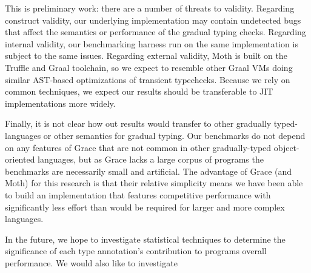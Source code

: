 \documentclass[sigplan,10pt,review,screen]{acmart}\settopmatter{printfolios=true}
\begin{document}
This is preliminary work: there are a number of threats to validity. 
Regarding construct validity, 
our underlying
implementation may contain undetected bugs that affect the semantics
or performance of the gradual typing checks. Regarding internal
validity,
our benchmarking harness run on the same implementation is
subject to the same issues. Regarding external validity, 
Moth is built
on the Truffle and Graal toolchain, so we expect
to resemble other Graal
VMs doing similar AST-based optimizations of transient typechecks.
Because we rely on common techniques, 
we expect our results should be transferable to JIT implementations
more widely.


Finally, it is not clear how out results would transfer
to other gradually typed-languages or other semantics for gradual typing.
Our benchmarks do not depend on any features of Grace
that are not common in other gradually-typed object-oriented
languages, but as Grace lacks a large corpus of programs the
benchmarks are necessarily small and artificial.
The advantage of Grace (and Moth) for this research is
that their relative simplicity means we have been able to build an
implementation that features competitive performance with significantly less
effort than would be required for larger and more complex languages.

In the future, we hope to investigate statistical techniques to
determine the significance of each type annotation's contribution to
programs overall performance.  We would also like to investigate 



\end{document}
